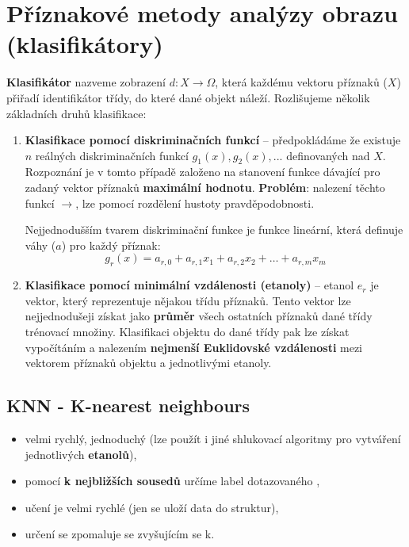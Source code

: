 \section{Příznakové metody analýzy obrazu (klasifikátory)}
\textbf{Klasifikátor} nazveme zobrazení $d: X \rightarrow \Omega$, která každému vektoru příznaků ($ X $) přiřadí identifikátor třídy, do které dané objekt náleží. Rozlišujeme několik základních druhů klasifikace:
\begin{enumerate}
    \item \textbf{Klasifikace pomocí diskriminačních funkcí} -- předpokládáme že existuje $n$ reálných diskriminačních funkcí $g_1(x), g_2(x), ...$ definovaných nad $X$. Rozpoznání je v tomto případě založeno na stanovení funkce dávající pro zadaný vektor příznaků \textbf{maximální hodnotu}. \textbf{Problém}: nalezení těchto funkcí $\rightarrow$, lze pomocí rozdělení hustoty pravděpodobnosti.

          Nejjednodušším tvarem diskriminační funkce je funkce lineární, která definuje váhy ($a$) pro každý příznak:
          \begin{equation*}
              g_r(x) = a_{r,0} + a_{r,1} x_1 + a_{r,2} x_2 + \ldots + a_{r,m}x_m
          \end{equation*}
    \item \textbf{Klasifikace pomocí minimální vzdálenosti (etanoly)} -- etanol $e_r$ je vektor, který reprezentuje nějakou třídu příznaků. Tento vektor lze nejjednodušeji získat jako \textbf{průměr} všech ostatních příznaků dané třídy trénovací množiny. Klasifikaci objektu do dané třídy pak lze získat vypočítáním a nalezením \textbf{nejmenší Euklidovské vzdálenosti} mezi vektorem příznaků objektu a jednotlivými etanoly.
\end{enumerate}

\subsection{KNN - K-nearest neighbours}
\begin{itemize}
    \item velmi rychlý, jednoduchý (lze použít i jiné shlukovací algoritmy pro vytváření jednotlivých \textbf{etanolů}),
    \item pomocí \textbf{k nejbližších sousedů} určíme label dotazovaného ,
    \item učení je velmi rychlé (jen se uloží data do struktur),
    \item určení se zpomaluje se zvyšujícím se k.
\end{itemize}

